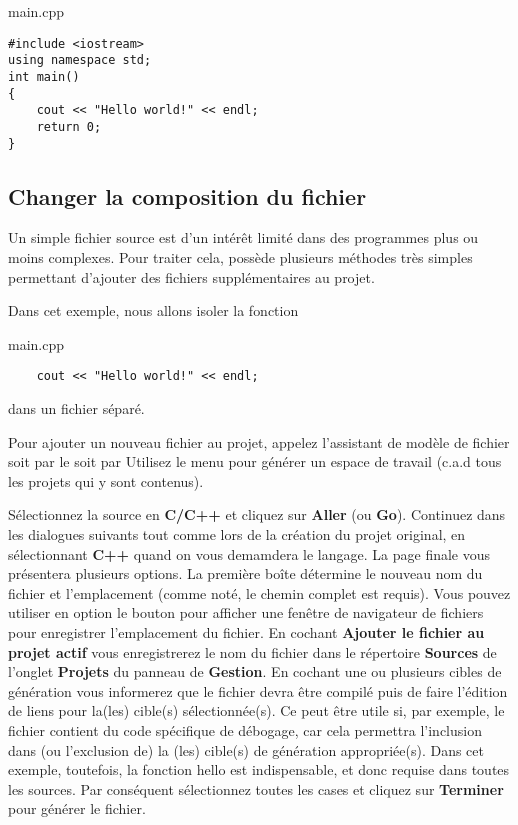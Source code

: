 main.cpp 
\begin{lstlisting}
#include <iostream>
using namespace std;
int main()
{
    cout << "Hello world!" << endl;
    return 0;
}
\end{lstlisting}

\subsection{Changer la composition du fichier}

Un simple fichier source est d'un intérêt limité dans des programmes plus ou moins complexes. Pour traiter cela, \codeblocks possède plusieurs méthodes très simples permettant d'ajouter des fichiers supplémentaires au projet.


Dans cet exemple, nous allons isoler la fonction

main.cpp
\begin{lstlisting}
    cout << "Hello world!" << endl;
\end{lstlisting}

dans un fichier séparé.


Pour ajouter un nouveau fichier au projet, appelez l'assistant de modèle de fichier soit par le  soit par  
Utilisez le menu  pour générer un espace de travail (c.a.d tous les projets qui y sont contenus). 

Sélectionnez la source en \textbf{C/C++} et cliquez sur \textbf{Aller} (ou \textbf{Go}). Continuez dans les dialogues suivants tout comme lors de la création du projet original, en sélectionnant \textbf{C++} quand on vous demamdera le langage. La page finale vous présentera plusieurs options. La première boîte détermine le nouveau nom du fichier et l'emplacement (comme noté, le chemin complet est requis). Vous pouvez utiliser en option le bouton  pour afficher une fenêtre de navigateur de fichiers pour enregistrer l'emplacement du fichier. En cochant \textbf{Ajouter le fichier au projet actif} vous enregistrerez le nom du fichier dans le répertoire \textbf{Sources} de l'onglet \textbf{Projets} du panneau de \textbf{Gestion}. En cochant une ou plusieurs cibles de génération vous informerez \codeblocks que le fichier devra être compilé puis de faire l'édition de liens pour la(les) cible(s) sélectionnée(s). Ce peut être utile si, par exemple, le fichier contient du code spécifique de débogage, car cela permettra l'inclusion dans (ou l'exclusion de) la (les) cible(s) de génération appropriée(s). Dans cet exemple, toutefois, la fonction hello est indispensable, et donc requise dans toutes les sources. Par conséquent sélectionnez toutes les cases et cliquez sur \textbf{Terminer} pour générer le fichier.

